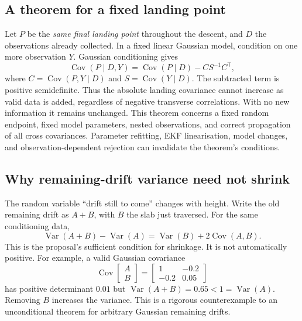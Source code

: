\subsection{A theorem for a fixed landing point}
Let $P$ be the \emph{same final landing point} throughout the descent, and $D$ the observations already collected. In a fixed linear Gaussian model, condition on one more observation $Y$. Gaussian conditioning gives
\begin{equation}
 \operatorname{Cov}(P\mid D,Y)
 =\operatorname{Cov}(P\mid D)-C S^{-1}C^{\mathsf T},
\end{equation}
where $C=\operatorname{Cov}(P,Y\mid D)$ and $S=\operatorname{Cov}(Y\mid D)$. The subtracted term is positive semidefinite. Thus the absolute landing covariance cannot increase as valid data is added, regardless of negative transverse correlations. With no new information it remains unchanged. This theorem concerns a fixed random endpoint, fixed model parameters, nested observations, and correct propagation of all cross covariances. Parameter refitting, EKF linearisation, model changes, and observation-dependent rejection can invalidate the theorem's conditions.

\subsection{Why remaining-drift variance need not shrink}
The random variable ``drift still to come'' changes with height. Write the old remaining drift as $A+B$, with $B$ the slab just traversed. For the same conditioning data,
\begin{equation}
 \operatorname{Var}(A+B)-\operatorname{Var}(A)
 =\operatorname{Var}(B)+2\operatorname{Cov}(A,B).
\end{equation}
This is the proposal's sufficient condition for shrinkage. It is not automatically positive. For example, a valid Gaussian covariance
\begin{equation}
 \operatorname{Cov}\begin{bmatrix}A\\B\end{bmatrix}
 =\begin{bmatrix}1&-0.2\\-0.2&0.05\end{bmatrix}
\end{equation}
has positive determinant $0.01$ but $\operatorname{Var}(A+B)=0.65<1=\operatorname{Var}(A)$. Removing $B$ increases the variance. This is a rigorous counterexample to an unconditional theorem for arbitrary Gaussian remaining drifts.

